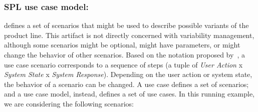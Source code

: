 \subsubsection{SPL use case model:} 

defines a set of scenarios that might be used to describe possible variants of the product line. This artifact is not directly concerned 
with variability management, although some scenarios might be optional, might have parameters, or might change the behavior of other 
scenarios. Based on the notation proposed by~\cite{gcabral-sbmf-2006},  a use case scenario corresponds to a sequence of
steps (a tuple of \emph{User Action} x \emph{System State} x \emph{System Response}). Depending on the user action or system state, 
the behavior of a scenario can be changed. A use case defines a set of scenarios; and a use case model, instead, defines a set of use cases.
In this running example, we are considering the following scenarios:

